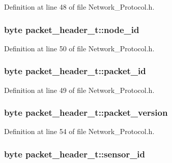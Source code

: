 Definition at line 48 of file Network\-\_\-\-Protocol.\-h.

\hypertarget{structpacket__header__t_a1d15be605146754ef15fa9e106cf29a7}{
\subsubsection[{node\-\_\-id}]{\setlength{\rightskip}{0pt plus 5cm}byte packet\-\_\-header\-\_\-t\-::node\-\_\-id}}\label{structpacket__header__t_a1d15be605146754ef15fa9e106cf29a7}


Definition at line 50 of file Network\-\_\-\-Protocol.\-h.

\hypertarget{structpacket__header__t_a14363cfa4c23a3bb13c6c9c3991570e1}{
\subsubsection[{packet\-\_\-id}]{\setlength{\rightskip}{0pt plus 5cm}byte packet\-\_\-header\-\_\-t\-::packet\-\_\-id}}\label{structpacket__header__t_a14363cfa4c23a3bb13c6c9c3991570e1}


Definition at line 49 of file Network\-\_\-\-Protocol.\-h.

\hypertarget{structpacket__header__t_a950aab6d5a8dccd50d77b90b1df6b9a4}{
\subsubsection[{packet\-\_\-version}]{\setlength{\rightskip}{0pt plus 5cm}byte packet\-\_\-header\-\_\-t\-::packet\-\_\-version}}\label{structpacket__header__t_a950aab6d5a8dccd50d77b90b1df6b9a4}


Definition at line 54 of file Network\-\_\-\-Protocol.\-h.

\hypertarget{structpacket__header__t_a64e26ea2331dd13764e3e5e4173c9f1a}{
\subsubsection[{sensor\-\_\-id}]{\setlength{\rightskip}{0pt plus 5cm}byte packet\-\_\-header\-\_\-t\-::sensor\-\_\-id}}\label{structpacket__header__t_a64e26ea2331dd13764e3e5e4173c9f1a}


